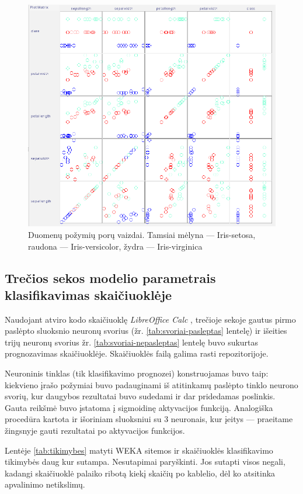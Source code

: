\documentclass{VUMIFPSbakalaurinis}
\begin{document}
\begin{figure}[H]
  \centering
  \includegraphics[scale=0.5]{img/scatter.png}
  \caption{Duomenų požymių porų vaizdai. 
  Tamsiai mėlyna — Iris-setosa, raudona — Iris-versicolor, 
  žydra — Iris-virginica}
  \label{img:scatter}
\end{figure}


\subsection{Trečios sekos modelio parametrais klasifikavimas skaičiuoklėje}
Naudojant atviro kodo skaičiuoklę \textit{LibreOffice Calc}
, trečioje sekoje gautus pirmo paslėpto sluoksnio neuronų
svorius (žr. \ref{tab:svoriai-pasleptas} lentelę) 
ir išeities trijų neuronų
svorius {žr. \ref{tab:svoriai-nepasleptas} lentelę} 
buvo sukurtas prognozavimas
skaičiuoklėje. Skaičiuoklės failą galima rasti repozitorijoje.

Neuroninis tinklas (tik klasifikavimo prognozei)
konstruojamas buvo taip: kiekvieno įrašo požymiai
buvo padauginami iš atitinkamų paslėpto tinklo neurono svorių,
kur daugybos rezultatai buvo sudedami ir dar pridedamas poslinkis.
Gauta reikšmė buvo įstatoma į sigmoidinę aktyvacijos funkciją.
Analogiška procedūra kartota ir išoriniam sluoksniui su 3 neuronais,
kur įeitys — praeitame žingsnyje gauti rezultatai po 
aktyvacijos funkcijos.

Lentėje \ref{tab:tikimybes} matyti WEKA sitemos ir
skaičiuoklės klasifikavimo tikimybės daug kur sutampa.
Nesutapimai paryškinti.
Jos sutapti visos negali, kadangi skaičiuoklė palaiko
ribotą kiekį skaičių po kablelio, dėl ko atsitinka apvalinimo
netikslimų.
\end{document}

